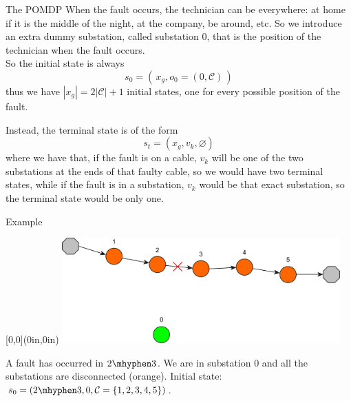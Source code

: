 \documentclass[10pt, aspectratio=169, compress, protectframetitle, handout]{beamer}
\begin{document}
\begin{frame}{The POMDP}
    When the fault occurs, the technician can be everywhere: at home if it is the middle of the night, at the company, be around, etc. So we introduce an extra dummy substation, called substation $0$, that is the position of the technician when the fault occurs.\\
    So the \alert{initial state} is always
    \begin{equation*}
        s_0 = ( \, x_g, o_0 = (0, \mathcal C) \, )
    \end{equation*}
    thus we have $|x_g| = 2 |\mathcal C| + 1$ initial states, one for every possible position of the fault. 
    
    \bigskip
    
    Instead, the \alert{terminal state} is of the form
    \begin{equation*}
        s_t = (x_g, v_k, \varnothing)
    \end{equation*}
    where we have that, if the fault is on a cable, $v_k$ will be one of the two substations at the ends of that faulty cable, so we would have two terminal states, while if the fault is in a substation, $v_k$ would be that exact substation, so the terminal state would be only one.

\end{frame}

\begin{frame}{Example}

    \begin{textblock*}{\textwidth}[0,0](0in,0in)
        \centering
        \includegraphics[width=0.8\textwidth]{figures/MDP_0.pdf}
    \end{textblock*}
    
    \vspace*{5cm}
    A fault has occurred in $2 \mhyphen 3$. We are in substation $0$ and all the substations are disconnected (orange). Initial state: $s_0 = (2 \mhyphen 3, 0, \mathcal C = \{1,2,3,4,5\})$.
    
\end{frame}
\end{document}
